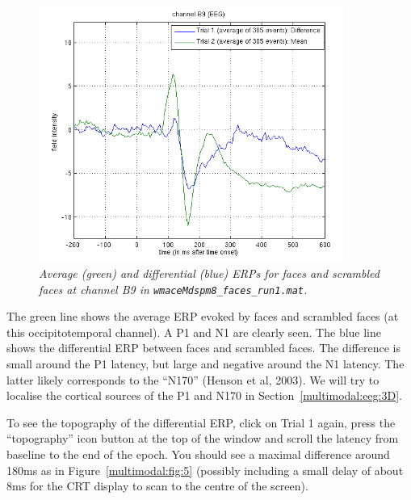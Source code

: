 \begin{figure}
\begin{center}
\includegraphics[width=100mm]{multimodal/figures/eeg_erp}
\caption{\em  Average (green) and differential (blue) ERPs for faces and scrambled faces at channel B9 in \texttt{wmaceMdspm8\_faces\_run1.mat}. \label{multimodal:fig:4}}
\end{center}
\end{figure}

The green line shows the average ERP evoked by faces and scrambled faces (at this occipitotemporal channel). A P1 and N1 are clearly seen. The blue line shows the differential ERP between faces and scrambled faces. The difference is small around the P1 latency, but large and negative around the N1 latency. The latter likely corresponds to the ``N170'' (Henson et al, 2003). We will try to localise the cortical sources of the P1 and N170 in Section~\ref{multimodal:eeg:3D}.

To see the topography of the differential ERP, click on Trial 1 again, press the ``topography'' icon button at the top of the window and scroll the latency from baseline to the end of the epoch. You should see a maximal difference around 180ms as in Figure~\ref{multimodal:fig:5} (possibly including a small delay of about 8ms for the CRT display to scan to the centre of the screen).

